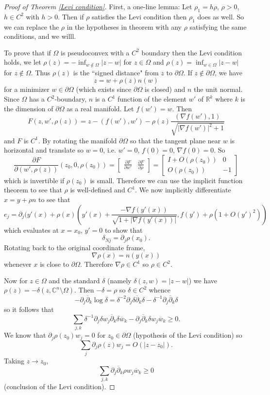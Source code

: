 \documentclass[12pt]{report}
\newcommand{\RR}{\mathbb{R}}
\newcommand{\CC}{\mathbb{C}}
\newcommand{\dbar}{\overline \partial}
\theoremstyle{definition}
\begin{document}
\begin{proof}[Proof of Theorem \ref{Levi condition}]
    First, a one-line lemma: Let $\rho_1 = h\rho$, $\rho > 0$, $h \in C^2$ with $h > 0$. Then if $\rho$ satisfies the Levi condition then $\rho_1$ does as well. So we can replace the $\rho$ in the hypotheses in theorem with any $\rho$ satisfying the same conditions, and we willl. 

    To prove that if $\Omega$ is pseudoconvex with a $C^2$ boundary then the Levi condition holds, we let $\rho(z) = -\inf_{w \notin \Omega} |z - w|$ for $z \in \Omega$ and $\rho(z) = \inf_{w \in \Omega} |z - w|$ for $z \notin \Omega$. Thus $\rho(z)$ is the ``signed distance" from $z$ to $\partial \Omega$. If $z \notin \partial \Omega$, we have
    $$z = w + \rho(z)n(w)$$
    for a minimizer $w \in \partial \Omega$ (which exists since $\partial \Omega$ is closed) and $n$ the unit normal. Since $\Omega$ has a $C^2$-boundary, $n$ is a $C^1$ function of the element $w'$ of $\RR^k$ where $k$ is the dimension of $\partial \Omega$ as a real manifold. Let $f(w') = w$. Then
    $$F(z, w', \rho(z)) = z - (f(w'), w') - \rho(z)\frac{(\nabla f(w'), 1)}{\sqrt{|\nabla f(w')|^2 + 1}}$$
    and $F$ is $C^1$. By rotating the manifold $\partial \Omega$ so that the tangent plane near $w$ is horizontal and translate so $w = 0$, i.e. $w' = 0$, $f(0) = 0$, $\nabla f(0) = 0$. So
    $$\frac{\partial F}{\partial(w', \rho(z))}(z_0, 0, \rho(z_0)) = \begin{bmatrix}\frac{\partial F}{\partial w'} & \frac{\partial F}{\partial \rho}\end{bmatrix} = \begin{bmatrix}I + O(\rho(z_0)) & 0 \\ O(\rho(z_0)) & -1\end{bmatrix}$$
    which is invertible if $\rho(z_0)$ is small. Therefore we can use the implicit function theorem to see that $\rho$ is well-defined and $C^1$. We now implicitly differentiate $x = y + \rho n$ to see that
    $$e_j = \partial_j(y'(x) + \rho(x)\left(y'(x) + \frac{-\nabla f(y'(x))}{\sqrt{1 + |\nabla f(y'(x))|}}, f(y') + \rho(1 + O(y')^2)\right)$$ which evaluates at $x = x_0$, $y' = 0$ to show that
    $$\delta_{Nj} = \partial_j \rho(x_0).$$
    Rotating back to the original coordinate frame,
    $$\nabla \rho(x) = n(y(x))$$
    whenever $x$ is close to $\partial \Omega$. Therefore $\nabla \rho \in C^1$ so $\rho \in C^2$.

    Now for $z \in \Omega$ and the standard $\delta$ (namely $\delta(z, w) = |z - w|$) we have $\rho(z) = -\delta(z, \CC^n \setminus \Omega)$. Then $-\delta = \rho$ so $\delta \in C^2$ whence
    $$-\partial_j \dbar_k \log \delta = \delta^{-2} \partial_j \delta \dbar_k \delta - \delta^{-1} \partial_j \dbar_k \delta$$
    so it follows that
    $$\sum_{j,k} \delta^{-1} \partial_j \delta w_j \dbar_k \delta \overline w_k - \partial_j \dbar_k \delta w_j \overline w_k \geq 0.$$
    We know that $\partial_j \rho(z_0) w_j = 0$ for $z_0 \in \partial \Omega$ (hypothesis of the Levi condition) so
    $$\sum_j \partial_j \rho(z) w_j = O(|z - z_0|).$$
    Taking $z \to z_0$,
    $$\sum_{j,k} \partial_j \dbar_k \rho w_j \overline w_k \geq 0$$
    (conclusion of the Levi condition).


\end{proof}
\end{document}
